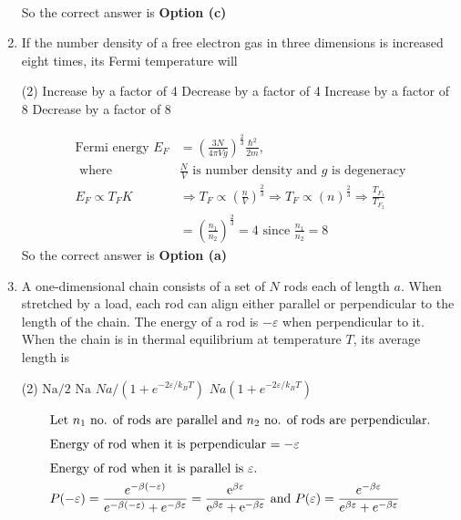 \begin{enumerate}
\begin{answer}
\begin{align*}
	\end{align*}
	So the correct answer is \textbf{Option (c)}	
\end{answer}
	\item If the number density of a free electron gas in three dimensions is increased eight times, its Fermi temperature will
	{}
	\begin{tasks}(2)
		\task[\textbf{a.}] Increase by a factor of 4
		\task[\textbf{b.}] Decrease by a factor of 4
		\task[\textbf{c.}] Increase by a factor of 8
		\task[\textbf{d.}] Decrease by a factor of 8
	\end{tasks}
\begin{answer}
	\begin{align*}
	\text{Fermi energy }E_{F}&=\left(\frac{3 N}{4 \pi V g}\right)^{\frac{2}{3}} \frac{\hbar^{2}}{2 m},\\\text{ where }&\frac{N}{V}\text{ is number density and $g$ is degeneracy}\\
	E_{F} \propto T_{F} K &\Rightarrow T_{F} \propto\left(\frac{n}{V}\right)^{\frac{2}{3}} \Rightarrow T_{F} \propto(n)^{\frac{2}{3}} \Rightarrow \frac{T_{F_{1}}}{T_{F_{2}}}\\&=\left(\frac{n_{1}}{n_{2}}\right)^{\frac{2}{3}}=4\text{ since } \frac{n_{1}}{n_{2}}=8
	\end{align*}
	So the correct answer is \textbf{Option (a)}
\end{answer}
	\item A one-dimensional chain consists of a set of $N$ rods each of length $a$. When stretched by a load, each rod can align either parallel or perpendicular to the length of the chain. The energy of a rod is $-\varepsilon$ when perpendicular to it. When the chain is in thermal equilibrium at temperature $T$, its average length is
	{}
	\begin{tasks}(2)
		\task[\textbf{a.}] $\mathrm{Na} / 2$
		\task[\textbf{b.}] $\mathrm{Na}$
		\task[\textbf{c.}] $N a /\left(1+e^{-2 \varepsilon / k_{B} T}\right)$
		\task[\textbf{d.}] $N a\left(1+e^{-2 \varepsilon / k_{B} T}\right)$
	\end{tasks}
\begin{answer}
	\begin{align*}
	\intertext{Let $n_{1}$ no. of rods are parallel and $n_{2}$ no. of rods are perpendicular.}
	\intertext{Energy of rod when it is perpendicular $=-\varepsilon$}
	\intertext{Energy of rod when it is parallel is $\varepsilon$.}
	P(-\varepsilon)&=\frac{e^{-\beta(-\varepsilon)}}{e^{-\beta(-\varepsilon)}+e^{-\beta \varepsilon}}=\frac{\mathrm{e}^{\beta \varepsilon}}{\mathrm{e}^{\beta \varepsilon}+\mathrm{e}^{-\beta \varepsilon}}\text{ and }P(\varepsilon)=\frac{e^{-\beta \varepsilon}}{e^{\beta \varepsilon}+e^{-\beta \varepsilon}}\\

\end{align*}
\end{answer}
\end{enumerate}
